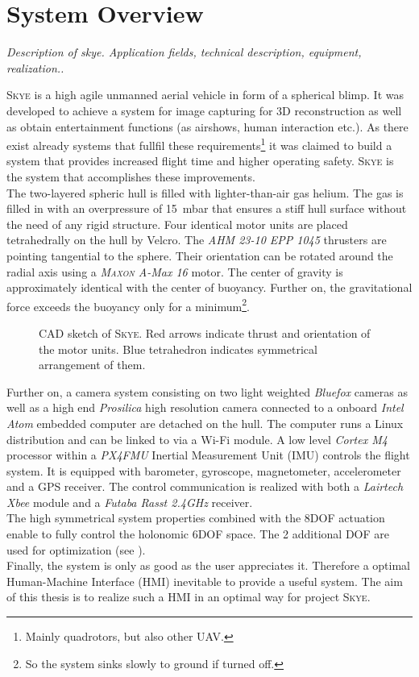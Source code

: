 \section{System Overview}
\label{sec:system overview}
\textit{Description of skye. Application fields, technical description, equipment, realization..}

\textsc{Skye} is a high agile unmanned aerial vehicle in form of a spherical blimp. It was developed to achieve a system for image capturing for 3D reconstruction as well as obtain entertainment functions (as airshows, human interaction etc.). As there exist already systems that fullfil these requirements\footnote{Mainly quadrotors, but also other UAV.} it was claimed to build a system that provides increased flight time and higher operating safety. \textsc{Skye} is the system that accomplishes these improvements. \\
The two-layered spheric hull is filled with lighter-than-air gas helium. The gas is filled in with an overpressure of \SI{15}{\milli\bar} that ensures a stiff hull surface without the need of any rigid structure. Four identical motor units are placed tetrahedrally on the hull by Velcro. The \textit{AHM 23-10 EPP 1045} thrusters are pointing tangential to the sphere. Their orientation can be rotated around the radial axis using a \textit{\textsc{Maxon} A-Max 16} motor. The center of gravity is approximately identical with the center of buoyancy. Further on, the gravitational force exceeds the buoyancy only for a minimum\footnote{So the system sinks slowly to ground if turned off.}.
\begin{figure}[H]
    \centering
    \def\svgwidth{0.8\columnwidth}
    
    \caption{CAD sketch of \textsc{Skye}. Red arrows indicate thrust and orientation of the motor units. Blue tetrahedron indicates symmetrical arrangement of them. }
    \label{fig:scene_trajectoryFollowing}
\end{figure}
Further on, a camera system consisting on two light weighted \textit{Bluefox} cameras as well as a high end \textit{Prosilica} high resolution camera connected to a onboard \textit{Intel Atom} embedded computer are detached on the hull. The computer runs a Linux distribution and can be linked to via a Wi-Fi module. A low level \textit{Cortex M4} processor within a \textit{PX4FMU} Inertial Measurement Unit (IMU) controls the flight system. It is equipped with barometer, gyroscope, magnetometer, accelerometer and a GPS receiver. The control communication is realized with both a \textit{Lairtech Xbee} module and a \textit{Futaba Rasst 2.4GHz} receiver. \\
The high symmetrical system properties combined with the 8DOF actuation enable to fully control the holonomic 6DOF space. The 2 additional DOF are used for optimization (see \cite{schaffnervu}).  \\
Finally, the system is only as good as the user appreciates it. Therefore a optimal Human-Machine Interface (HMI) inevitable to provide a useful system. The aim of this thesis is to realize such a HMI in an optimal way for project \textsc{Skye}.
